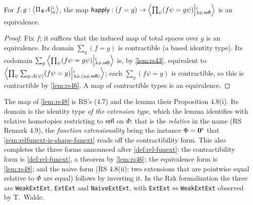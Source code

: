 \begin{lemma}\label{lem:rs48}
	For $f,g:\Ext{i}{\Pi_\Psi A}{a}$, the map
	$\mathsf{happly}:(f=g)\to\Ext{i}{\prod_{\psi}(f\psi=g\psi)}{\lambda\phi.\mathsf{refl}}$
	is an equivalence.
\end{lemma}
\begin{proof}
	Fix $f$; it suffices that the induced map of total spaces over $g$ is an
	equivalence. Its domain $\sum_g(f=g)$ is contractible (a based identity type). Its
	codomain
	$\sum_g\Ext{i}{\prod_{\psi}(f\psi=g\psi)}{\lambda\phi.\mathsf{refl}}$ is,
	by \cref{lem:rs43}, equivalent to
	$\Ext{i}{\prod_{\psi}\sum_{y:A(\psi)}(f\psi=y)}{\lambda\phi.(a\phi,\mathsf{refl})}$;
	each $\sum_{y}(f\psi=y)$ is contractible, so this is contractible by
	\cref{lem:rs46}. A map of contractible types is an equivalence.
\end{proof}

The map of \cref{lem:rs48} is RS's (4.7) and the lemma their Proposition
4.8(i). Its domain is the identity type \emph{of the extension type}, which the
lemma identifies with relative homotopies restricting to $\mathsf{refl}$ on
$\Phi$: that is the \emph{relative} in the name (RS Remark 4.9), the
\emph{function extensionality} being the instance $\Phi=\szero$ that
\cref{rem:relfunext-is-shape-funext} reads off the contractibility form. This
also completes the three forms announced after \cref{def:rel-funext}: the
contractibility form is \cref{def:rel-funext}, a theorem by \cref{lem:rs46};
the equivalence form is \cref{lem:rs48}; and the naive form (RS 4.8(ii): two
extensions that are pointwise equal relative to $\Phi$ are equal) follows by
inverting it. In the Rzk formalization \citep{KRW2024} the three are
\texttt{WeakExtExt}, \texttt{ExtExt} and \texttt{NaiveExtExt}, with
\texttt{ExtExt}$\Leftrightarrow$\texttt{WeakExtExt} observed by T.\ Walde.


